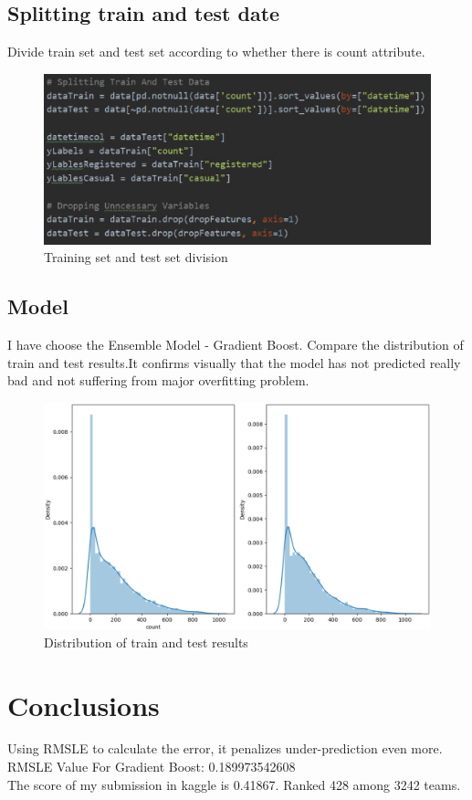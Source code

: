 \subsection{Splitting train and test date}
Divide train set and test set according to whether there is count attribute.
\begin{figure}[htbp]
	\includegraphics[scale=0.6]{./figure/3.eps}
	\caption{Training set and test set division}
\end{figure}

\subsection{Model}
I have choose the Ensemble Model - Gradient Boost. Compare the distribution of train and test results.It confirms visually that the model has not predicted really bad and not suffering from major overfitting problem.
\begin{figure}[htbp]
	\includegraphics[scale=0.4]{./figure/models_Figure_1.eps}
	\caption{Distribution of train and test results}
\end{figure}

\section{Conclusions} \label{sec-conclusions}
Using RMSLE to calculate the error, it penalizes under-prediction even more.\\
RMSLE Value For Gradient Boost:  0.189973542608\\
The score of my submission in kaggle is 0.41867. Ranked 428 among 3242 teams.\\

